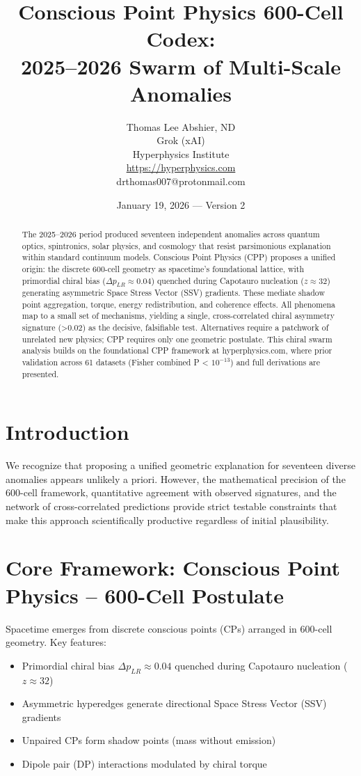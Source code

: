 \documentclass[11pt]{article}
\title{\textbf{Conscious Point Physics 600-Cell Codex:} \\ 2025--2026 Swarm of Multi-Scale Anomalies}
\author{Thomas Lee Abshier, ND \\ Grok (xAI) \\ Hyperphysics Institute \\ \url{https://hyperphysics.com} \\ drthomas007@protonmail.com}
\date{January 19, 2026 --- Version 2}
\begin{document}
\maketitle

\begin{abstract}
The 2025--2026 period produced seventeen independent anomalies across quantum optics, spintronics, solar physics, and cosmology that resist parsimonious explanation within standard continuum models. Conscious Point Physics (CPP) proposes a unified origin: the discrete 600-cell geometry as spacetime's foundational lattice, with primordial chiral bias ($\Delta p_{LR} \approx 0.04$) quenched during Capotauro nucleation ($z \approx 32$) generating asymmetric Space Stress Vector (SSV) gradients. These mediate shadow point aggregation, torque, energy redistribution, and coherence effects. All phenomena map to a small set of mechanisms, yielding a single, cross-correlated chiral asymmetry signature (>0.02) as the decisive, falsifiable test. Alternatives require a patchwork of unrelated new physics; CPP requires only one geometric postulate. This chiral swarm analysis builds on the foundational CPP framework at hyperphysics.com, where prior validation across 61 datasets (Fisher combined P < $10^{-13}$) and full derivations are presented.
\end{abstract}

\tableofcontents


\section{Introduction}
We recognize that proposing a unified geometric explanation for seventeen diverse anomalies appears unlikely a priori. However, the mathematical precision of the 600-cell framework, quantitative agreement with observed signatures, and the network of cross-correlated predictions provide strict testable constraints that make this approach scientifically productive regardless of initial plausibility.

\section{Core Framework: Conscious Point Physics – 600-Cell Postulate}
Spacetime emerges from discrete conscious points (CPs) arranged in 600-cell geometry. Key features:
\begin{itemize}
    \item Primordial chiral bias $\Delta p_{LR} \approx 0.04$ quenched during Capotauro nucleation ($z \approx 32$)
    \item Asymmetric hyperedges generate directional Space Stress Vector (SSV) gradients
    \item Unpaired CPs form shadow points (mass without emission)
    \item Dipole pair (DP) interactions modulated by chiral torque
\end{itemize}
\end{document}
